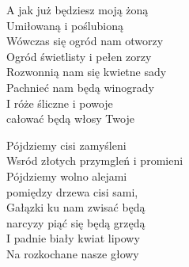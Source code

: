 \begin{text}
    A jak już będziesz moją żoną\\
    Umiłowaną i poślubioną\\
    Wówczas się ogród nam otworzy\\
    Ogród świetlisty i pełen zorzy\\
    Rozwonnią nam się kwietne sady\\
    Pachnieć nam będą winogrady\\
    I róże śliczne i powoje\\
    całować będą włosy Twoje

    Pójdziemy cisi zamyśleni\\
    Wsród złotych przymgleń i promieni\\
    Pójdziemy wolno alejami\\
    pomiędzy drzewa cisi sami,\\
    Gałązki ku nam zwisać będą\\
    narcyzy piąć się będą grzędą\\
    I padnie biały kwiat lipowy\\
    Na rozkochane nasze głowy
\end{text}
\begin{chord}

\end{chord}
